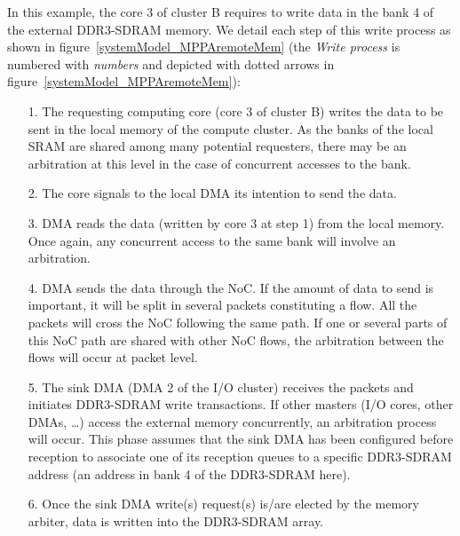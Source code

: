 \documentclass[main.tex]{subfiles}
\begin{document}
\begin{example}
In this example, the core 3 of cluster B requires to write data in the bank 4 of the external DDR3-SDRAM memory. We detail each step of this write process as shown in figure~\ref{systemModel_MPPAremoteMem} 
    (the \emph{Write process} is numbered with \emph{numbers} and depicted with dotted arrows in figure~\ref{systemModel_MPPAremoteMem}):
\begin{enumerate}
    \item[1.] The requesting computing core (core 3 of cluster B) writes the data to be sent in the local memory of the compute cluster. As the banks of the local SRAM are shared among many potential requesters, there may be an arbitration at this level in the case of concurrent accesses to the bank. 
	\item[2.] The core signals to the local DMA its intention to send the data.
	\item[3.] DMA reads the data (written by core 3 at step 1) from the local memory. Once again, any concurrent access to the same bank will involve an arbitration.
	\item[4.] DMA sends the data through the NoC. If the amount of data to send is important, it will be split in several packets constituting a flow. All the packets will cross the NoC following the same path. If one or several parts of this NoC path are shared with other NoC flows, the arbitration between the flows will occur at packet level.
	\item[5.] The sink DMA (DMA 2 of the I/O cluster) receives the packets and initiates DDR3-SDRAM write transactions. If other masters (I/O cores, other DMAs, \ldots) access the external memory concurrently, an arbitration process will occur. This phase assumes that the sink DMA has been configured before reception to associate one of its reception queues to a specific DDR3-SDRAM address (an address in bank 4 of the DDR3-SDRAM here). 
	\item[6.] Once the sink DMA write(s) request(s) is/are elected by the memory arbiter, data is written into the DDR3-SDRAM array.
\end{enumerate}
\end{example}
\end{document}
